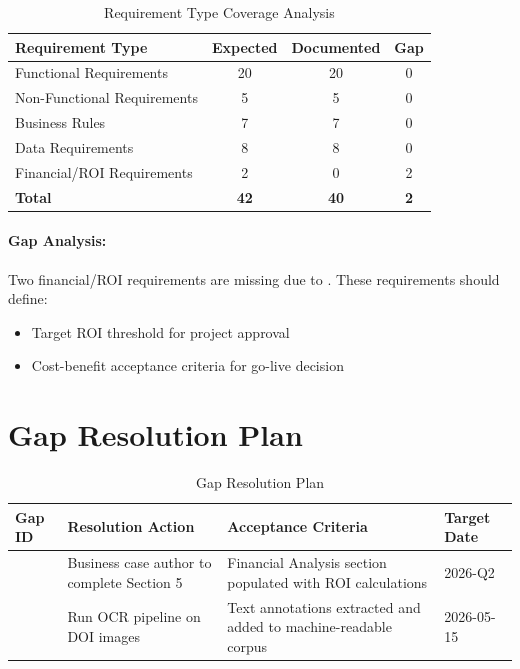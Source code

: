 \begin{table}[h]
\centering
\caption{Requirement Type Coverage Analysis}
\label{tab:requirement-type-coverage}
\begin{tabular}{@{}L{4cm}ccc@{}}
\toprule
\textbf{Requirement Type} & \textbf{Expected} & \textbf{Documented} & \textbf{Gap} \\
\midrule
Functional Requirements & 20 & 20 & 0 \\
Non-Functional Requirements & 5 & 5 & 0 \\
Business Rules & 7 & 7 & 0 \\
Data Requirements & 8 & 8 & 0 \\
Financial/ROI Requirements & 2 & 0 & \textcolor{gapred}{2} \\
\midrule
\textbf{Total} & \textbf{42} & \textbf{40} & \textbf{2} \\
\bottomrule
\end{tabular}
\end{table}

\paragraph{Gap Analysis:} Two financial/ROI requirements are missing due to
. These requirements should define:
\begin{itemize}[noitemsep]
  \item Target ROI threshold for project approval
  \item Cost-benefit acceptance criteria for go-live decision
\end{itemize}

\section{Gap Resolution Plan}
\label{sec:gap-resolution}

\begin{table}[h]
\centering
\caption{Gap Resolution Plan}
\label{tab:gap-resolution-plan}
\begin{tabularx}{\textwidth}{@{}C{1.5cm}L{4cm}L{4.5cm}C{2.5cm}@{}}
\toprule
\textbf{Gap ID} & \textbf{Resolution Action} & \textbf{Acceptance Criteria} & \textbf{Target Date} \\
\midrule
{} & Business case author to complete Section 5 & Financial Analysis section populated with ROI calculations & 2026-Q2 \\
 & Run OCR pipeline on DOI images & Text annotations extracted and added to machine-readable corpus & 2026-05-15 \\
\bottomrule
\end{tabularx}
\end{table}

